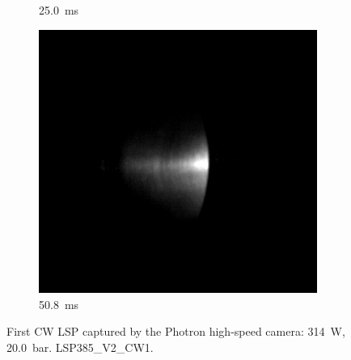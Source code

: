\begin{figure}[!ht]
\begin{subfigure}[t]{0.3\textwidth}
        \caption{\qty{25.0}{ms}}
    \end{subfigure}
    \hfill
    \begin{subfigure}[t]{0.3\textwidth}
        \centering
        \includegraphics[width=\textwidth]{assets/4 experiments/CW LSP frames Photron/LSP385_V2_CW1_Fr508.png}
        \caption{\qty{50.8}{ms}}
    \end{subfigure}
    \caption{First CW LSP captured by the Photron high-speed camera: \qty{314}{W}, \qty{20.0}{bar}. LSP385\_V2\_CW1.}
    \label{fig:CW_V2_Photron_frames}
\end{figure}

